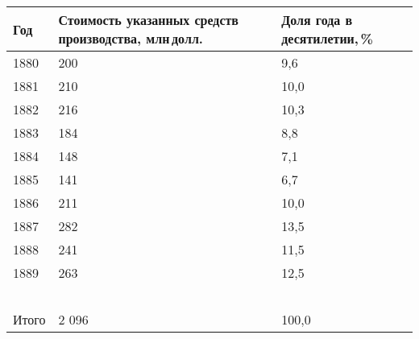\documentclass[leqno]{article}  %
\begin{document}
\begin{table}[htbp]
\centering
\footnotesize{
\begin{tabular}{p{}|p{}|p{}}
\hline
\centering Год & Стоимость указанных средств производства, млн\,долл. & Доля года в десятилетии,\,\% \\
\hline
1880 & \hfill 200 \hspace*{1cm} & \hfill 9,6 \hspace*{1cm} \\
1881 & \hfill 210 \hspace*{1cm} & \hfill 10,0 \hspace*{1cm} \\
1882 & \hfill 216 \hspace*{1cm} & \hfill 10,3 \hspace*{1cm} \\
1883 & \hfill 184 \hspace*{1cm} & \hfill 8,8 \hspace*{1cm} \\
1884 & \hfill 148 \hspace*{1cm} & \hfill 7,1 \hspace*{1cm} \\
1885 & \hfill 141 \hspace*{1cm} & \hfill 6,7 \hspace*{1cm} \\
1886 & \hfill 211 \hspace*{1cm} & \hfill 10,0 \hspace*{1cm} \\
1887 & \hfill 282 \hspace*{1cm} & \hfill 13,5 \hspace*{1cm} \\
1888 & \hfill 241 \hspace*{1cm} & \hfill 11,5 \hspace*{1cm} \\
1889 & \hfill 263 \hspace*{1cm} & \hfill 12,5 \hspace*{1cm} \\
& \hfill  \hrulefill\ \hspace*{1cm} & \hfill  \hrulefill\ \hspace*{1cm} \\
\centering Итого & \hfill 2 096 \hspace*{1cm} & \hfill 100,0 \hspace*{1cm} \\
\hline
\end{tabular}
}
\end{table}
\end{document}
